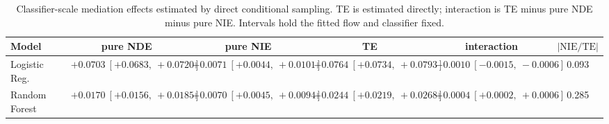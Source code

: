 \begin{table}[htbp]
  \centering
  \caption{Classifier-scale mediation effects estimated by direct conditional sampling. TE is estimated directly; interaction is TE minus pure NDE minus pure NIE. Intervals hold the fitted flow and classifier fixed.}
  \label{tab:german_gap_overall}
  \begin{tabular}{lccccc}
    \toprule
    Model & pure NDE & pure NIE & TE & interaction & $|\mathrm{NIE}/\mathrm{TE}|$ \\
    \midrule
    Logistic Reg. & $+0.0703\ [+0.0683,\ +0.0720]$ & $+0.0071\ [+0.0044,\ +0.0101]$ & $+0.0764\ [+0.0734,\ +0.0793]$ & $-0.0010\ [-0.0015,\ -0.0006]$ & 0.093 \\
    Random Forest & $+0.0170\ [+0.0156,\ +0.0185]$ & $+0.0070\ [+0.0045,\ +0.0094]$ & $+0.0244\ [+0.0219,\ +0.0268]$ & $+0.0004\ [+0.0002,\ +0.0006]$ & 0.285 \\
    \bottomrule
  \end{tabular}
\end{table}